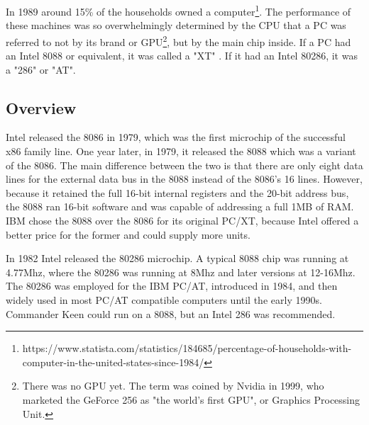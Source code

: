 \documentclass[book.tex]{subfiles}
\begin{document}
  In 1989 around 15\% of the households owned a computer\footnote{https://www.statista.com/statistics/184685/percentage-of-households-with-computer-in-the-united-states-since-1984/}. The performance of these machines was so overwhelmingly determined by the CPU that a PC was referred to not by its brand or GPU\footnote{There was no GPU yet. The term was coined by Nvidia in 1999, who marketed the GeForce 256 as "the world's first GPU", or Graphics Processing Unit.}, but by the main chip inside. If a PC had an Intel 8088 or equivalent, it was called a "XT" . If it had an Intel 80286, it was a "286" or "AT".\\
\subsection{Overview}
  Intel released the 8086 in 1979, which was the first microchip of the successful x86 family line. One year later, in 1979, it released the 8088 which was a variant of the 8086. The main difference between the two is that there are only eight data lines for the external data bus in the 8088 instead of the 8086's 16 lines.  However, because it retained the full 16-bit internal registers and the 20-bit address bus, the 8088 ran 16-bit software and was capable of addressing a full 1MB of RAM. IBM chose the 8088 over the 8086 for its original PC/XT, because Intel offered a better price for the former and could supply more units. \\
  \par
  In 1982 Intel released the 80286 microchip. A typical 8088 chip was running at 4.77Mhz, where the 80286 was running at 8Mhz and later versions at 12-16Mhz. The 80286 was employed for the IBM PC/AT, introduced in 1984, and then widely used in most PC/AT compatible computers until the early 1990s. Commander Keen could run on a 8088, but an Intel 286 was recommended.\\   

\par
\end{document}

